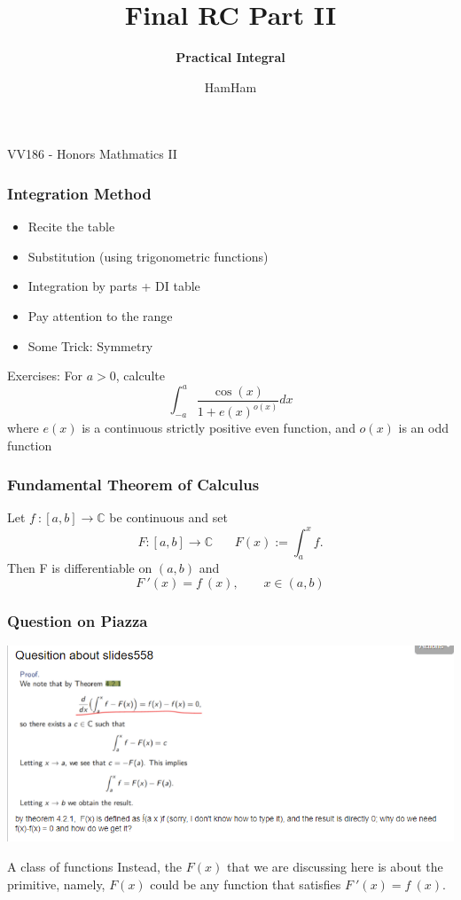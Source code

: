 \documentclass{beamer}
\title{\sffamily Final RC Part II}
\subtitle{\textbf{Practical Integral}\\}
\institute[UM-SJTU JI]{University of Michigan-Shanghai Jiao Tong University Joint Institute}
\author{HamHam}
\newcommand{\myfont}{\rmfamily\normalsize\upshape\mdseries}
\begin{document}
\begin{titlepage}
    \begin{center}
        VV186 - Honors Mathmatics II
    \end{center}
\end{titlepage}
\myfont
\begin{frame}
    \frametitle{Integration Method}
    \begin{itemize}
        \item Recite the table
        \item Substitution (using trigonometric functions)
        \item Integration by parts + DI table
        \item Pay attention to the range
        \item Some Trick: Symmetry
    \end{itemize}
    \vspace{1em}
    \hspace{1em} Exercises: For $a>0$, calculte 
    $$\int_{-a}^a \frac{\cos(x)}{1+e(x)^{o(x)}} dx$$
    where $e(x)$ is a continuous strictly positive even function, and $o(x)$ is an odd function
\end{frame}
\begin{frame}
    \frametitle{Fundamental Theorem of Calculus}
    Let $f ~: [a, b] \to \mathbb{C}$ be continuous and set
    $$F : [a, b] \to \mathbb{C} ~~~~~~~~F(x) := \int_a^x f.$$
    Then F is differentiable on $(a, b)$ and
    $$F~'(x) = f ~(x), ~~~~~~~~~x \in (a, b)$$
\end{frame}
\begin{frame}
    \frametitle{Question on Piazza}
    \centering
    \includegraphics[height=0.4\textwidth]{question.png}
    \begin{block}{A class of functions}
        Instead, the $F(x)$ that we are discussing here is about the primitive, 
        namely, $F(x)$ could be any function that satisfies $F~'(x) = f~(x)$.
    \end{block}
\end{frame}
\end{document}
